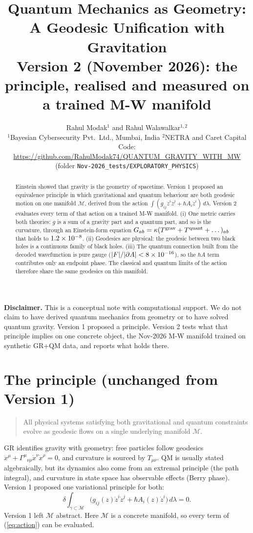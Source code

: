 \documentclass[11pt]{article}
\title{\textbf{Quantum Mechanics as Geometry:\\ A Geodesic Unification with Gravitation}\\[3pt]
\large Version 2 (November 2026): the principle, realised and measured on a trained M-W manifold}
\author{Rahul Modak$^{1}$ and Rahul Walawalkar$^{1,2}$\\[2pt]
\small $^1$Bayesian Cybersecurity Pvt.\ Ltd., Mumbai, India \quad $^2$NETRA and Caret Capital\\
\small Code: \url{https://github.com/RahulModak74/QUANTUM_GRAVITY_WITH_MW}\\ \small (folder \texttt{Nov-2026\_tests/EXPLORATORY\_PHYSICS})}
\date{}
\begin{document}
\maketitle
\begin{framed}
\small\textbf{Disclaimer.} This is a conceptual note with computational support. We do not claim to
have derived quantum mechanics from geometry or to have solved quantum gravity. Version 1 proposed
a principle. Version 2 tests what that principle implies on one concrete object, the Nov-2026
M-W manifold trained on synthetic GR+QM data, and reports what holds there.
\end{framed}

\begin{abstract}
Einstein showed that gravity is the geometry of spacetime. Version 1 proposed an equivalence
principle in which gravitational and quantum behaviour are both geodesic motion on one manifold
$\mathcal M$, derived from the action
$\int(g_{ij}\dot z^i\dot z^j+\hbar A_i\dot z^i)\,d\lambda$. Version 2 evaluates every term of that
action on a trained M-W manifold. (i) One metric carries both theories: $g$ is a sum of a
gravity part and a quantum part, and so is the curvature, through an Einstein-form equation
$G_{ab}=\kappa(T^{\rm grav}+T^{\rm quant}+\dots)_{ab}$ that holds to $1.2\times10^{-8}$. (ii) Geodesics are
physical: the geodesic between two black holes is a continuous family of black holes. (iii) The
quantum connection built from the decoded wavefunction is pure gauge ($|F|/|\partial A|<8\times10^{-16}$),
so the $\hbar A$ term contributes only an endpoint phase. The classical and quantum limits of the
action therefore share the same geodesics on this manifold.
\end{abstract}

\section{The principle (unchanged from Version 1)}
\begin{quote}
All physical systems satisfying both gravitational and quantum constraints evolve as geodesic
flows on a single underlying manifold $\mathcal M$.
\end{quote}
GR identifies gravity with geometry: free particles follow geodesics
$\ddot x^\mu+\Gamma^\mu{}_{\nu\rho}\dot x^\nu\dot x^\rho=0$, and curvature is sourced by
$T_{\mu\nu}$. QM is usually stated algebraically, but its dynamics also come from an extremal
principle (the path integral), and curvature in state space has observable effects (Berry phase).
Version 1 proposed one variational principle for both:
\begin{equation}
\delta\!\int_{\gamma\subset\mathcal M}\bigl(g_{ij}(z)\dot z^i\dot z^j+\hbar A_i(z)\dot z^i\bigr)\,d\lambda=0.
\label{eq:action}
\end{equation}
Version 1 left $\mathcal M$ abstract. Here $\mathcal M$ is a concrete manifold, so every term of
(\ref{eq:action}) can be evaluated.
\end{document}
